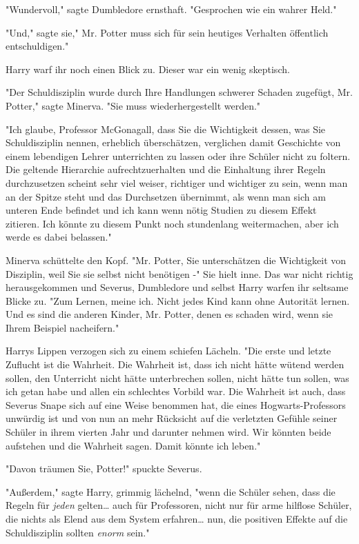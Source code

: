 {"Wundervoll," sagte Dumbledore ernsthaft. "Gesprochen wie ein wahrer Held."

"Und," sagte sie," Mr. Potter muss sich für sein heutiges Verhalten öffentlich entschuldigen."

Harry warf ihr noch einen Blick zu. Dieser war ein wenig skeptisch.

"Der Schuldisziplin wurde durch Ihre Handlungen schwerer Schaden zugefügt, Mr. Potter," sagte Minerva. "Sie muss wiederhergestellt werden."

"Ich glaube, Professor McGonagall, dass Sie die Wichtigkeit dessen, was Sie Schuldisziplin nennen, erheblich überschätzen, verglichen damit Geschichte von einem lebendigen Lehrer unterrichten zu lassen oder ihre Schüler nicht zu foltern. Die geltende Hierarchie aufrechtzuerhalten und die Einhaltung ihrer Regeln durchzusetzen scheint sehr viel weiser, richtiger und wichtiger zu sein, wenn man an der Spitze steht und das Durchsetzen übernimmt, als wenn man sich am unteren Ende befindet und ich kann wenn nötig Studien zu diesem Effekt zitieren. Ich könnte zu diesem Punkt noch stundenlang weitermachen, aber ich werde es dabei belassen."

Minerva schüttelte den Kopf. "Mr. Potter, Sie unterschätzen die Wichtigkeit von Disziplin, weil Sie sie selbst nicht benötigen -" Sie hielt inne. Das war nicht richtig herausgekommen und Severus, Dumbledore und selbst Harry warfen ihr seltsame Blicke zu. "Zum Lernen, meine ich. Nicht jedes Kind kann ohne Autorität lernen. Und es sind die anderen Kinder, Mr. Potter, denen es schaden wird, wenn sie Ihrem Beispiel nacheifern."

Harrys Lippen verzogen sich zu einem schiefen Lächeln. "Die erste und letzte Zuflucht ist die Wahrheit. Die Wahrheit ist, dass ich nicht hätte wütend werden sollen, den Unterricht nicht hätte unterbrechen sollen, nicht hätte tun sollen, was ich getan habe und allen ein schlechtes Vorbild war. Die Wahrheit ist auch, dass Severus Snape sich auf eine Weise benommen hat, die eines Hogwarts-Professors unwürdig ist und von nun an mehr Rücksicht auf die verletzten Gefühle seiner Schüler in ihrem vierten Jahr und darunter nehmen wird. Wir könnten beide aufstehen und die Wahrheit sagen. Damit könnte ich leben."

"Davon träumen Sie, Potter!" spuckte Severus.

"Außerdem," sagte Harry, grimmig lächelnd, "wenn die Schüler sehen, dass die Regeln für \emph{jeden} gelten… auch für Professoren, nicht nur für arme hilflose Schüler, die nichts als Elend aus dem System erfahren… nun, die positiven Effekte auf die Schuldisziplin sollten \emph{enorm} sein."

}
